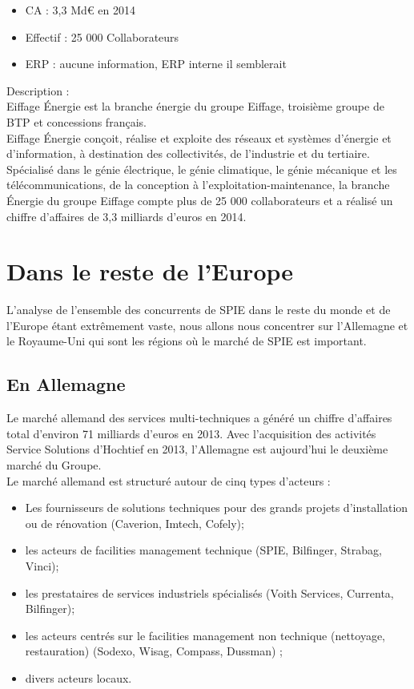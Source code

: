 \begin{itemize}
    \item CA : 3,3 Md€ en 2014
    \item Effectif : 25 000 Collaborateurs 
    \item ERP : aucune information, ERP interne il semblerait
\end{itemize}

Description : \\

Eiffage Énergie est la branche énergie du groupe Eiffage, troisième groupe de BTP et concessions français. \\

Eiffage Énergie conçoit, réalise et exploite des réseaux et systèmes d'énergie et d'information, à destination des collectivités, de l’industrie et du tertiaire.
Spécialisé dans le génie électrique, le génie climatique, le génie mécanique et les télécommunications, de la conception à l’exploitation-maintenance, la branche Énergie du groupe Eiffage compte plus de 25 000 collaborateurs et a réalisé un chiffre d’affaires de 3,3 milliards d’euros en 2014.

\section{Dans le reste de l'Europe}
    
L’analyse de l’ensemble des concurrents de SPIE dans le reste du monde et de l’Europe étant extrêmement vaste, nous allons nous concentrer sur l’Allemagne et le Royaume-Uni qui sont les régions où le marché de SPIE est important.

\subsection{En Allemagne}

Le marché allemand des services multi-techniques a généré un chiffre d’affaires total d’environ 71 milliards d’euros en 2013. Avec l’acquisition des activités Service Solutions d’Hochtief en 2013, l’Allemagne est aujourd’hui le deuxième marché du Groupe.  \\

Le marché allemand est structuré autour de cinq types d’acteurs : 
\begin{itemize}
    \item Les fournisseurs de solutions techniques pour des grands projets d’installation ou de rénovation (Caverion, Imtech, Cofely); 
    \item les acteurs de facilities management technique (SPIE, Bilfinger, Strabag, Vinci);
    \item les prestataires de services industriels spécialisés (Voith Services, Currenta, Bilfinger);
    \item les acteurs centrés sur le facilities management non technique (nettoyage, restauration) (Sodexo, Wisag, Compass, Dussman) ;
    \item divers acteurs locaux. 
\end{itemize}

